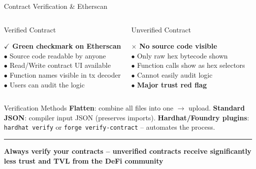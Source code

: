 \documentclass[8pt,aspectratio=169]{beamer}
\newcommand{\bottomnote}[1]{\vfill\vspace{-2mm}\textcolor{mllavender2}{\rule{\textwidth}{0.4pt}}\vspace{1mm}\footnotesize\textbf{#1}}
\begin{document}
\begin{frame}{Contract Verification \& Etherscan}
\begin{center}
\end{center}
\vspace{2mm}
\begin{columns}
\begin{block}{Verified Contract}
\colorbox{mlgreen!10}{\parbox{0.92\linewidth}{\small
\textbf{$\checkmark$ Green checkmark on Etherscan}\\[1mm]
$\bullet$ Source code readable by anyone\\
$\bullet$ Read/Write contract UI available\\
$\bullet$ Function names visible in tx decoder\\
$\bullet$ Users can audit the logic
}}
\end{block}
\begin{block}{Unverified Contract}
\colorbox{mlred!10}{\parbox{0.92\linewidth}{\small
\textbf{$\times$ No source code visible}\\[1mm]
$\bullet$ Only raw hex bytecode shown\\
$\bullet$ Function calls show as hex selectors\\
$\bullet$ Cannot easily audit logic\\
$\bullet$ \textbf{Major trust red flag}
}}
\end{block}
\end{columns}
\vspace{2mm}
\begin{alertblock}{Verification Methods}
\small \textbf{Flatten}: combine all files into one $\to$ upload. \textbf{Standard JSON}: compiler input JSON (preserves imports). \textbf{Hardhat/Foundry plugins}: \texttt{hardhat verify} or \texttt{forge verify-contract} -- automates the process.
\end{alertblock}
\bottomnote{Always verify your contracts -- unverified contracts receive significantly less trust and TVL from the DeFi community}
\end{frame}
\end{document}
